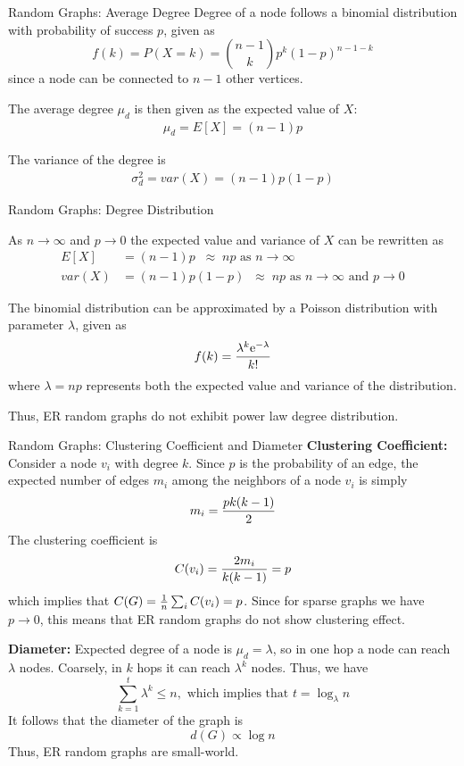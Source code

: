 \begin{frame}{Random Graphs: Average Degree}
Degree of a node follows a binomial distribution with probability of
success $p$, given as
$$f(k) = P(X=k) = {n-1 \choose k} p^k (1-p)^{n-1-k}$$
since a node can be connected to $n-1$ other vertices.


\medskip
The average degree $\mu_d$ is then given as the expected value of
$X$:
\begin{align*}
    \mu_d = E[X] = (n-1)p
\end{align*}

\medskip
The variance of the degree is
\begin{align*}
    \sigma^2_d = var(X) = (n-1)p(1-p)
\end{align*}
\end{frame}


\begin{frame}{Random Graphs: Degree Distribution}

As $n \to \infty$ and $p \to 0$
the expected value and
variance of $X$ can be rewritten as
\begin{align*}
    E[X] & = (n-1)p \;\; \approx \; np \text{ as } n \to \infty\\
    var(X) & = (n-1)p(1-p) \;\; \approx \; np \text{ as } n \to \infty
    \text{ and } p \to 0
\end{align*}

\medskip
The binomial distribution can be approximated by a Poisson
distribution with parameter $\lambda$, given as
\begin{align*}
f(k) = {\lambda^k \mathrm{e}^{-\lambda} \over k!}
\end{align*}
where $\lambda = np$ represents both the expected value and
variance of the distribution.

\medskip
Thus, ER random graphs do not exhibit power law degree distribution.
\end{frame}


\begin{frame}{Random Graphs: Clustering Coefficient and Diameter}
\small
{\bf Clustering Coeff\/{i}cient:}
Consider a node $v_i$ with degree $k$.
Since $p$ is the
probability of an edge, the expected number of edges $m_i$ among
the neighbors of a node $v_i$ is simply
$$m_i = {p k (k-1) \over 2}$$
The clustering coefficient is 
$$C(v_i) = {2m_i \over k(k-1)} = p$$
which implies that $C(G) = {1 \over n} \sum_i C(v_i) = p$.
\smallskip
Since for sparse graphs we have $p \to 0$, this means that ER random
graphs do not show clustering effect.

\bigskip
{\bf Diameter:}
Expected degree of a node is $\mu_d=\lambda$, so in
one hop a node can reach $\lambda$ nodes. 
Coarsely, in $k$ hops it can reach $\lambda^k$ nodes. Thus, we have
$$\sum_{k=1}^t \lambda^k \le n,
\text{ which implies that }
t = \log_{\lambda} n$$
It follows that
the diameter of the graph is
$$d(G) \propto \log n$$
Thus, ER random graphs are small-world.
\end{frame}


